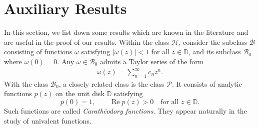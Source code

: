 \documentclass[a4paper,12pt]{amsart}
\theoremstyle{definition}
\newcounter {own}
\begin{document}

%
%
%


\section{Auxiliary Results}\label{T-section-002}
In this section, we list down some results which are known in the literature and are useful in the proof of our results.
Within the class $\mathcal{H}$, consider the subclass $\mathcal{B}$ consisting of functions $\omega$ satisfying $|\omega(z)| < 1$ for all $z \in \mathbb{D}$, and its subclass $\mathcal{B}_0$ where $\omega(0) = 0$. Any $\omega \in \mathcal{B}_0$ admits a Taylor series of the form
\begin{align}\label{T-01}
\omega(z)=\sum_{n=1}^\infty c_n z^n.
\end{align}
With the class $\mathcal{B}_0$, a closely related class is the class $\mathcal{P}$. It consists of analytic functions \(p(z)\) on the unit disk \(\mathbb{D}\) satisfying
\[
p(0) = 1, \qquad \operatorname{Re} p(z) > 0 \quad \text{for all } z \in \mathbb{D}.
\]
Such functions are called \emph{Carathéodory functions}. They appear naturally in the study of univalent functions.\\
\end{document}
